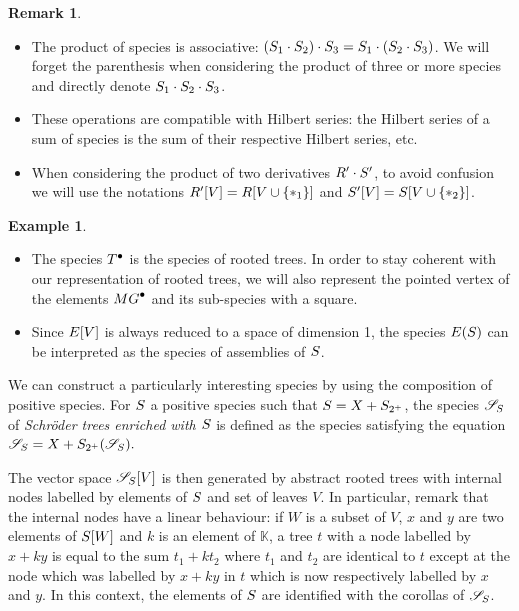 \documentclass[11pt]{article}
\theoremstyle{definition}
\newtheorem{exam}[theo]{Example}
\newtheorem{rema}[theo]{Remark}
\numberwithin{equation}{section}
\newcommand{\set}[1]{\left\{#1\right\}}
\newcommand{\spe}[1]{\normalfont{\textsc{#1}}}
\newcommand{\K}{\mathbb{K}}
\newcommand{\point}[1]{#1^{\bullet}}
\newcommand{\T}{\spe{T}}
\newcommand{\MG}{\spe{MG}}
\newcommand{\stree}[1]{\mathscr{S}_{{#1}}}
\newcommand{\Sym}{\spe{E}}
\begin{document}
\begin{rema}\label{remark_operations}\
    \begin{itemize}
        \item The product of species is associative: $(\spe{S}_1\cdot\spe{S}_2)\cdot\spe{S}_3 = \spe{S}_1\cdot(\spe{S}_2\cdot\spe{S}_3)$.
        We will forget the parenthesis when considering the product of three or more species and directly denote $\spe{S}_1\cdot\spe{S}_2\cdot\spe{S}_3$.
        \item These operations are compatible with Hilbert series: the Hilbert series of a sum of species is the sum of their respective
        Hilbert series, etc.
        \item When considering the product of two derivatives $\spe{R}'\cdot\spe{S}'$, to avoid confusion we will use 
        the notations $\spe{R}'[V] = \spe{R}[V\cup\set{\ast_1}]$ and $\spe{S}'[V] = \spe{S}[V\cup\set{\ast_2}]$.
    \end{itemize}
\end{rema}

\begin{exam}\label{example_derivation}\
    \begin{itemize}
        \item The species $\point{\T}$ is the species of rooted trees. In order to stay coherent with our representation
        of rooted trees, we will also represent the pointed vertex of the elements $\point{\MG}$ and its sub-species
        with a square.
        \item Since $\Sym[V]$ is always reduced to a space of dimension 1, the species $\Sym(\spe{S})$ can 
        be interpreted as the species of assemblies of $\spe{S}$.
    \end{itemize}
\end{exam}

We can construct a particularly interesting species by using the composition of positive species. For 
$\spe{S}$ a positive species such that $\spe{S} = \spe{X} + \spe{S}_{2^+}$, the species $\stree{\spe{S}}$ 
of {\em Schröder trees enriched with $\spe{S}$} is defined as the species satisfying the equation
\begin{math}
    \stree{\spe{S}} = \spe{X} + \spe{S}_{2^+}(\stree{\spe{S}}).
\end{math}


The vector space $\stree{\spe{S}}[V]$ is then generated by abstract rooted trees with internal nodes labelled
by elements of $\spe{S}$ and set of leaves $V$. In particular, remark that the internal nodes have a linear
behaviour: if $W$ is a subset of $V$, $x$ and $y$ are two elements of $\spe{S}[W]$ and $k$ is an element of
$\K$, a tree $t$ with a node labelled by $x+ky$ is equal to the sum $t_1+kt_2$ where $t_1$ and $t_2$ are
identical to $t$ except at the node which was labelled by $x+ky$ in $t$ which is now respectively labelled by 
$x$ and $y$. In this context, the elements of $\spe{S}$ are identified with the corollas of $\stree{\spe{S}}$.
\end{document}
